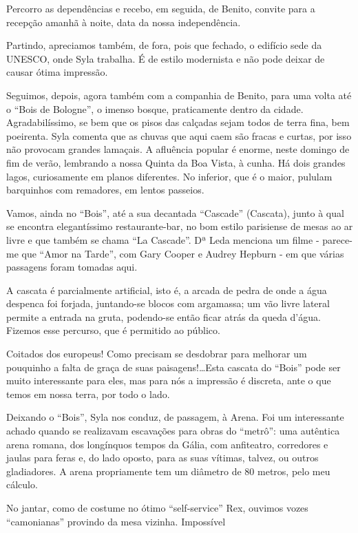 Percorro as dependências e recebo, em seguida, de Benito, convite para a recepção amanhã à noite, data da nossa independência.

Partindo, apreciamos também, de fora, pois que fechado, o edifício sede da UNESCO, onde Syla trabalha. É de estilo modernista e não pode deixar de causar ótima impressão.

Seguimos, depois, agora também com a companhia de Benito, para uma volta até o ``Bois de Bologne'', o imenso bosque, praticamente dentro da cidade. Agradabilíssimo, se bem que os pisos das calçadas sejam todos de terra fina, bem poeirenta. Syla comenta que as chuvas que aqui caem são fracas e curtas, por isso não provocam grandes lamaçais. A afluência popular é enorme, neste domingo de fim de verão, lembrando a nossa Quinta da Boa Vista, à cunha. Há dois grandes lagos, curiosamente em planos diferentes. No inferior, que é o maior, pululam barquinhos com remadores, em lentos passeios.

Vamos, ainda no ``Bois'', até a sua decantada ``Cascade'' (Cascata), junto à qual se encontra elegantíssimo restaurante-bar, no bom estilo parisiense de mesas ao ar livre e que também se chama ``La Cascade''. Dª Leda menciona um filme - parece-me que ``Amor na Tarde'', com Gary Cooper e Audrey Hepburn - em que várias passagens foram tomadas aqui.

A cascata é parcialmente artificial, isto é, a arcada de pedra de onde a água despenca foi forjada, juntando-se blocos com argamassa; um vão livre lateral permite a entrada na gruta, podendo-se então ficar atrás da queda d’água. Fizemos esse percurso, que é permitido ao público.

Coitados dos europeus! Como precisam se desdobrar para melhorar um pouquinho a falta de graça de suas paisagens!\ldots Esta cascata do ``Bois'' pode ser muito interessante para eles, mas para nós a impressão é discreta, ante o que temos em nossa terra, por todo o lado.

Deixando o ``Bois'', Syla nos conduz, de passagem, à Arena. Foi um interessante achado quando se realizavam escavações para obras do ``metrô'': uma autêntica arena romana, dos longínquos tempos da Gália, com anfiteatro, corredores e jaulas para feras e, do lado oposto, para as suas vítimas, talvez, ou outros gladiadores. A arena propriamente tem um diâmetro de 80 metros, pelo meu cálculo.

No jantar, como de costume no ótimo ``self-service'' Rex, ouvimos vozes ``camonianas'' provindo da mesa vizinha. Impossível

